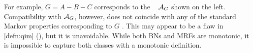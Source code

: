 For example, 
$G = A{-}B{-}C$
corresponds to the \hgraph\ 
\commentout{
\[
    \Ar_{G} = \Bigg\{
            \begin{array}{r@{}l} \{B\}&{\to}\{A\},\\ \{A,C\}&{\to}\{B\},\\ \{B\}&{\to}\{C\}
            \end{array}\Bigg\}
    =     \begin{tikzpicture}[center base]
        \node[dpad1] (A) at (-0.6,0) {$A$};
        \node[dpad1] (B) at (0,1) {$B$};
        \node[dpad1] (C) at (0.6,0) {$C$};

        \draw[arr2,<-] (A) -- (B);
        \draw[arr2,<-] (C) -- (B);
        \mergearr[arr2] ACB
    \end{tikzpicture}
    ~.
\]
}
$\mathcal A_G$ shown on the left.
% 
Compatibility
with $\mathcal A_G$, however, does not coincide with any of the standard Markov properties
corresponding to $G$
    \citep{lauritzen-mrf-indeps}.
%
This may appear to be a flaw in \cref{defn:qim} (\scibility), but it is unavoidable.  
While both BNs and MRFs are monotonic, it is impossible to capture both classes with a monotonic definition.

